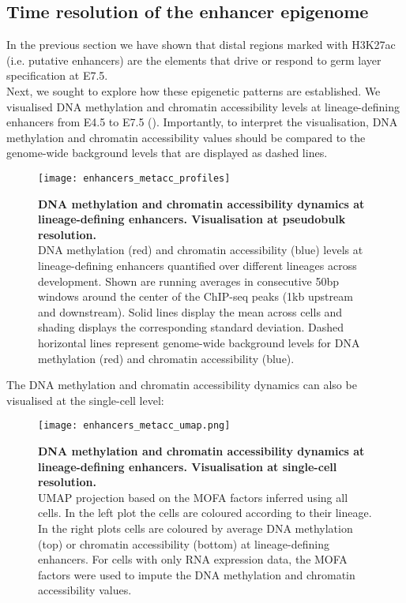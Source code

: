 \subsection{Time resolution of the enhancer epigenome}

In the previous section we have shown that distal regions marked with H3K27ac (i.e. putative enhancers) are the elements that drive or respond to germ layer specification at E7.5.\\
Next, we sought to explore how these epigenetic patterns are established. We visualised DNA methylation and chromatin accessibility levels at lineage-defining enhancers from E4.5 to E7.5 (). Importantly, to interpret the visualisation, DNA methylation and chromatin accessibility values should be compared to the genome-wide background levels that are displayed as dashed lines.

\begin{figure}[H]
	\centering
	\texttt{[image: enhancers\_metacc\_profiles]}
	\caption[]{
	\textbf{DNA methylation and chromatin accessibility dynamics at lineage-defining enhancers. Visualisation at pseudobulk resolution.} \\
	DNA methylation (red) and chromatin accessibility (blue) levels at lineage-defining enhancers quantified over different lineages across development. Shown are running averages in consecutive 50bp windows around the center of the ChIP-seq peaks (1kb upstream and downstream). Solid lines display the mean across cells and shading displays the corresponding standard deviation. Dashed horizontal lines represent genome-wide background levels for DNA methylation (red) and chromatin accessibility (blue).
	}
	\label{fig:enhancers_metacc_profiles}
\end{figure}

The DNA methylation and chromatin accessibility dynamics can also be visualised at the single-cell level:

\begin{figure}[H]
	\centering
	\texttt{[image: enhancers\_metacc\_umap.png]}
	\caption[]{
	\textbf{DNA methylation and chromatin accessibility dynamics at lineage-defining enhancers. Visualisation at single-cell resolution.} \\
	UMAP projection based on the MOFA factors inferred using all cells. In the left plot the cells are coloured according to their lineage. In the right plots cells are coloured by average DNA methylation (top) or chromatin accessibility (bottom) at lineage-defining enhancers. For cells with only RNA expression data, the MOFA factors were used to impute the DNA methylation and chromatin accessibility values.
	}
	\label{fig:enhancers_metacc_umap}
\end{figure}


